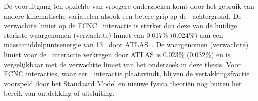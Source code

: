 De vooruitgang ten opzichte van vroegere onderzoeken komt door het gebruik van andere kinematische variabelen alsook  een betere grip op de \NPL\ achtergrond.  De verwachtte limiet op de  FCNC \Zut\ interactie is sterker dan deze van de huidige sterkste waargenomen (verwachtte) limiet  van 0.017\% (0.024\%) aan een massamiddelpuntsenergie van 13 \TeV\ door  ATLAS~\cite{ATLAS-CONF-2017-070}.  De waargenomen (verwachtte) limiet voor de \Zct\ interactie verkregen door ATLAS is 0.023\% (0.032\%) en is vergelijkbaar met de verwachtte limiet van het onderzoek in deze thesis. Voor  FCNC interacties,  waar een  \tZq\ interactie plaatsvindt, blijven de vertakkingsfractie voorspeld door het Standaard Model en nieuwe fysica theori\"en nog buiten het bereik van ontdekking of uitsluiting. 